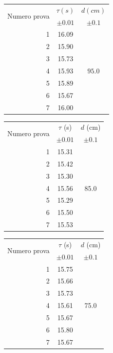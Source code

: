 \documentclass{article}
\begin{document}
\begin{table}[h!]
	\hspace{-0.05\textwidth}
	\begin{minipage}{0.1\textwidth}
		\centering
		\begin{tabular}{ | r | c | c | }
			\hline
			\multirow{2}{5em}{Numero prova}& $\tau (s)$ & $d (cm) $ \\
			& $\pm 0.01$ & $\pm 0.1$ \\
			\hline
			1 & 16.09 & \multirow{7}{1em}{$95.0$} \\ \cline{1-2}
			2 & 15.90 & \\	\cline{1-2}
			3 & 	15.73 & \\	\cline{1-2}
			4 &	15.93 & \\	\cline{1-2}
			5 &	15.89 & \\	\cline{1-2}
			6 &	15.67 & \\	\cline{1-2}
			7 &	16.00 & \\	\cline{1-2}
			\hline
		\end{tabular}
	\end{minipage}
	\hspace{0.3\textwidth}
	\begin{minipage}{0.1\textwidth}
		\centering
		\begin{tabular}{ | r | c | c | }
    		\hline
    		\multirow{2}{5em}{Numero prova} & $\tau$ (s) & $d$ (cm) \\
    		& $\pm 0.01$ & $\pm 0.1$ \\
    		\hline
    		1 & 15.31 & \multirow{7}{*}{85.0} \\ \cline{1-2}
    		2 & 15.42 & \\ \cline{1-2}
    		3 & 15.30 & \\ \cline{1-2}
    		4 & 15.56 & \\ \cline{1-2}
    		5 & 15.29 & \\ \cline{1-2}
    		6 & 15.50 & \\ \cline{1-2}
    		7 & 15.53 & \\ \cline{1-2}
    		\hline
		\end{tabular}
	\end{minipage}
	\hspace{0.3\textwidth}
	\begin{minipage}{0.1\textwidth}
		\centering
		\begin{tabular}{ | r | c | c | }
    		\hline
    		\multirow{2}{5em}{Numero prova} & $\tau$ (s) & $d$ (cm) \\
    		& $\pm 0.01$ & $\pm 0.1$ \\
    		\hline
    		1 & 15.75 & \multirow{7}{*}{75.0} \\ \cline{1-2}
    		2 & 15.66 & \\ \cline{1-2}
    		3 & 15.73 & \\ \cline{1-2}
    		4 & 15.61 & \\ \cline{1-2}
    		5 & 15.67 & \\ \cline{1-2}
    		6 & 15.80 & \\ \cline{1-2}
    		7 & 15.67 & \\ \cline{1-2}
    		\hline
		\end{tabular}
	\end{minipage}
\end{table}
\end{document}
